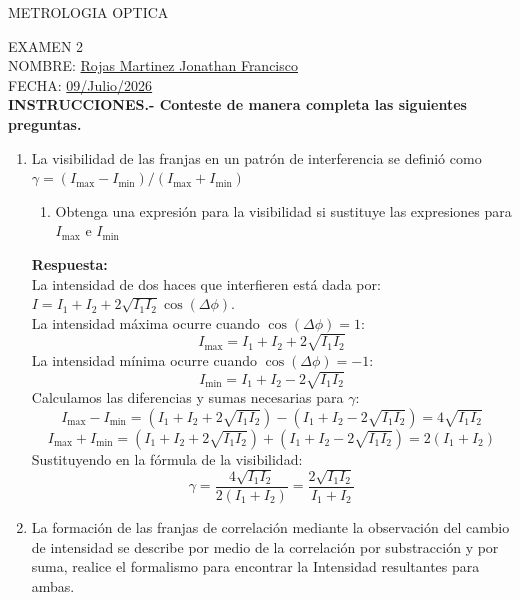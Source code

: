 \documentclass[12pt]{article}
\begin{document}
	
	\begin{center}
		\textcolor{red!80!black}{\large METROLOGIA OPTICA}
	\end{center}
	
	\noindent \textcolor{red!80!black}{EXAMEN 2} \\
	NOMBRE: \underline{Rojas Martinez Jonathan Francisco} \\
	FECHA: \underline{09/Julio/2026} \\
	
	\vspace{0.5cm}
	\noindent \textbf{INSTRUCCIONES.- Conteste de manera completa las siguientes preguntas.}
	\vspace{0.3cm}
	
	\begin{enumerate}
		\renewcommand{\labelenumi}{\arabic{enumi}.-}
		
		\item La visibilidad de las franjas en un patrón de interferencia se definió como $\gamma=(I_{\max}-I_{\min})/(I_{\max}+I_{\min})$
		\begin{enumerate}
			\item[a)] Obtenga una expresión para la visibilidad si sustituye las expresiones para $I_{\max}$ e $I_{\min}$
		\end{enumerate}
		
		\vspace{0.2cm}
		\textcolor{blue!70!black}{\textbf{Respuesta:}} \\
		La intensidad de dos haces que interfieren está dada por: $I = I_1 + I_2 + 2\sqrt{I_1 I_2}\cos(\Delta\phi)$. \\
		La intensidad máxima ocurre cuando $\cos(\Delta\phi) = 1$:
		\[ I_{\max} = I_1 + I_2 + 2\sqrt{I_1 I_2} \]
		La intensidad mínima ocurre cuando $\cos(\Delta\phi) = -1$:
		\[ I_{\min} = I_1 + I_2 - 2\sqrt{I_1 I_2} \]
		Calculamos las diferencias y sumas necesarias para $\gamma$:
		\[ I_{\max} - I_{\min} = (I_1 + I_2 + 2\sqrt{I_1 I_2}) - (I_1 + I_2 - 2\sqrt{I_1 I_2}) = 4\sqrt{I_1 I_2} \]
		\[ I_{\max} + I_{\min} = (I_1 + I_2 + 2\sqrt{I_1 I_2}) + (I_1 + I_2 - 2\sqrt{I_1 I_2}) = 2(I_1 + I_2) \]
		Sustituyendo en la fórmula de la visibilidad:
		\[ \gamma = \frac{4\sqrt{I_1 I_2}}{2(I_1 + I_2)} = \frac{2\sqrt{I_1 I_2}}{I_1 + I_2} \]
		
		\vspace{0.5cm}
		\item La formación de las franjas de correlación mediante la observación del cambio de intensidad se describe por medio de la correlación por substracción y por suma, realice el formalismo para encontrar la Intensidad resultantes para ambas.
		

\end{enumerate}
\end{document}
